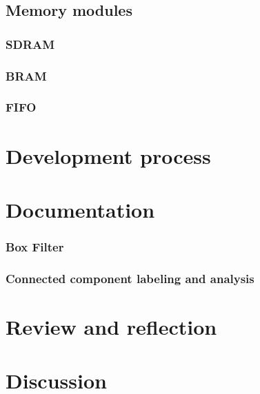 \documentclass[12pt]{report}
\begin{document}
\section{Memory modules}
\subsection{SDRAM}
\subsection{BRAM}
\subsection{FIFO}
\chapter{Development process}

\chapter{Documentation}

\subsection{Box Filter}
\subsection{Connected component labeling and analysis}

\chapter{Review and reflection}

\chapter{Discussion}




\end{document}
